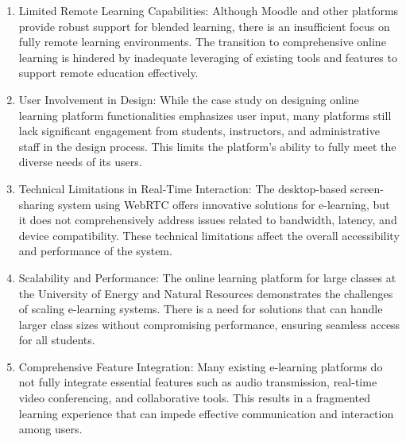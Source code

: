 \documentclass[a4paper,12pt]{article}  %
\begin{document}
\begin{enumerate}
      \item Limited Remote Learning Capabilities: Although Moodle and other platforms
            provide robust support for blended learning, there is an insufficient focus on
            fully remote learning environments. The transition to comprehensive online
            learning is hindered by inadequate leveraging of existing tools and features to
            support remote education effectively.\\

      \item User Involvement in Design: While the case study on designing online learning
            platform functionalities emphasizes user input, many platforms still lack
            significant engagement from students, instructors, and administrative staff in
            the design process. This limits the platform's ability to fully meet the
            diverse needs of its users.\\

      \item Technical Limitations in Real-Time Interaction: The desktop-based
            screen-sharing system using WebRTC offers innovative solutions for e-learning,
            but it does not comprehensively address issues related to bandwidth, latency,
            and device compatibility. These technical limitations affect the overall
            accessibility and performance of the system.\\

      \item Scalability and Performance: The online learning platform for large classes at
            the University of Energy and Natural Resources demonstrates the challenges of
            scaling e-learning systems. There is a need for solutions that can handle
            larger class sizes without compromising performance, ensuring seamless access
            for all students.\\

      \item Comprehensive Feature Integration: Many existing e-learning platforms do not
            fully integrate essential features such as audio transmission, real-time video
            conferencing, and collaborative tools. This results in a fragmented learning
            experience that can impede effective communication and interaction among
            users.\\
\end{enumerate}
\end{document}
